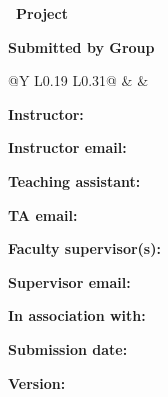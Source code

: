 \thispagestyle{empty}
{\large\bfseries\color{SmithBlue}\MakeUppercase{\FacultyName}\par}
{\normalsize\InstitutionName\par}
{\normalsize\DepartmentName\par}

\vspace{0.52in}
\PrintProjectLogo
{\Large\bfseries\color{QueensBurgundy}\CourseShortCode\ Project \DocumentType\par}
\vspace{9pt}
{\LARGE\bfseries\color{QueensBurgundy}\ProjectTitle\par}
\vspace{8pt}
{\normalsize\AcademicTerms\par}
\GuideLabel

\vspace{12pt}
\textbf{Submitted by Group} \GroupNumber
\begin{TableBlock}
\begin{tabularx}{\linewidth}{@{}Y L{0.19\linewidth} L{0.31\linewidth}@{}}
 &  &  \\
\TeamMembers
\bottomrule
\end{tabularx}
\end{TableBlock}

\begin{singlespace}
\textbf{Instructor:} \Instructor\par
\textbf{Instructor email:} \InstructorEmail\par
\textbf{Teaching assistant:} \TA\par
\textbf{TA email:} \TAEmail\par
\textbf{Faculty supervisor(s):} \FacultySupervisor\par
\textbf{Supervisor email:} \SupervisorEmail\par
\ifincludeindustrypartner
\textbf{In association with:} \IndustryPartner\par
\fi
\textbf{Submission date:} \SubmissionDate\par
\textbf{Version:} \DocumentVersion\par
\end{singlespace}

\vfill
{}
\clearpage
